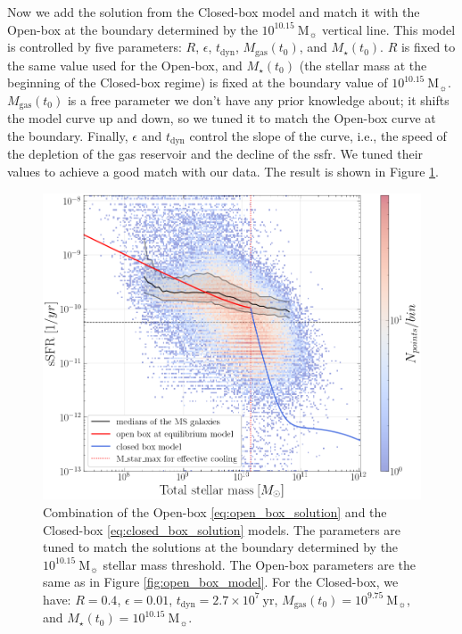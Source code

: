 \documentclass[fleqn, usenatbib]{mnras}
\begin{document}
Now we add the solution from the Closed-box model and match it with the Open-box at the boundary determined by the \(10^{10.15}\ \mathrm{M_{\sun}}\) vertical line. This model is controlled by five parameters: \(R\), \(\epsilon\), \(t_{\mathrm{dyn}}\), \(M_{\mathrm{gas}}(t_0)\), and \(M_{\star}(t_0)\). \(R\) is fixed to the same value used for the Open-box, and \(M_{\star}(t_0)\) (the stellar mass at the beginning of the Closed-box regime) is fixed at the boundary value of \(10^{10.15}\ \mathrm{M_{\sun}}\). \(M_{\mathrm{gas}}(t_0)\) is a free parameter we don't have any prior knowledge about; it shifts the model curve up and down, so we tuned it to match the Open-box curve at the boundary. Finally, \(\epsilon\) and \(t_{\mathrm{dyn}}\) control the slope of the curve, i.e., the speed of the depletion of the gas reservoir and the decline of the \acrshort{ssfr}. We tuned their values to achieve a good match with our data. The result is shown in Figure \ref{fig:combined_model}.
\begin{figure}
	\includegraphics[width=\columnwidth]{images/combined_model.png}
	\caption{Combination of the Open-box \eqref{eq:open_box_solution} and the Closed-box \eqref{eq:closed_box_solution} models. The parameters are tuned to match the solutions at the boundary determined by the \(10^{10.15}\ \mathrm{M_{\sun}}\) stellar mass threshold. The Open-box parameters are the same as in Figure \ref{fig:open_box_model}. For the Closed-box, we have: \(R = 0.4\), \(\epsilon = 0.01\), \(t_{\mathrm{dyn}} = 2.7 \times 10^7\ \mathrm{yr}\), \(M_{\mathrm{gas}}(t_0) = 10^{9.75}\ \mathrm{M_{\sun}}\), and \(M_{\star}(t_0) = 10^{10.15}\ \mathrm{M_{\sun}}\).}
	\label{fig:combined_model}
\end{figure}
\end{document}
